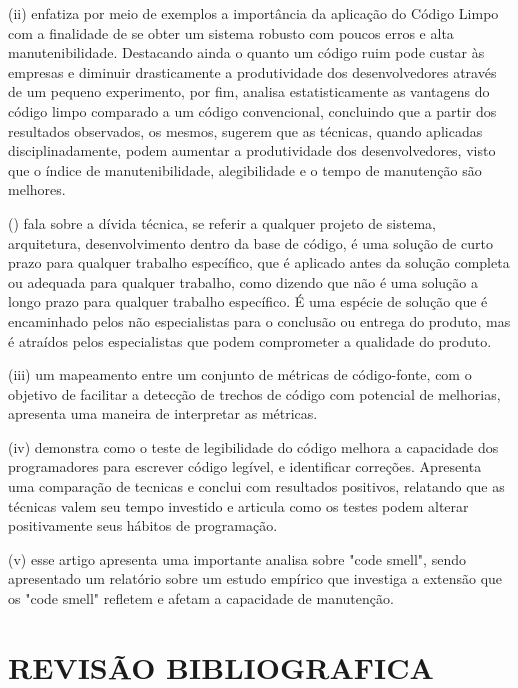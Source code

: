 \documentclass[12pt]{article}
\begin{document}
 (ii) \cite{TR_CLEAN_CODE_IMPORTANCIA} enfatiza por meio de exemplos a importância da aplicação do
Código Limpo com a finalidade de se obter um sistema robusto com poucos erros e alta manutenibilidade. Destacando ainda o quanto um código ruim pode custar às empresas e diminuir drasticamente a produtividade dos desenvolvedores através de um pequeno experimento, por fim, analisa estatisticamente as vantagens do código limpo comparado a um código convencional, concluindo que a partir dos resultados observados, os mesmos, sugerem que as técnicas, quando aplicadas disciplinadamente, podem aumentar a produtividade dos desenvolvedores, visto que o índice de manutenibilidade, alegibilidade e o tempo de manutenção são melhores.
 
 () \cite{TR_QC_TECHNICAL_DEBT} fala sobre a dívida técnica, se referir a qualquer projeto de sistema, arquitetura, desenvolvimento dentro da base de código, é uma solução de curto prazo para qualquer trabalho específico, que é aplicado antes da solução completa ou adequada para
qualquer trabalho, como dizendo que não é uma solução a longo prazo para qualquer trabalho específico. É uma espécie de solução que é encaminhado pelos não especialistas para o conclusão ou entrega do produto, mas é atraídos pelos especialistas que podem comprometer a qualidade do produto.

 (iii) \cite{TR_CLEAN_CODE_METRICA} um mapeamento entre um conjunto de métricas de código-fonte, com o objetivo de facilitar a detecção de trechos de código com potencial de melhorias, apresenta uma maneira de interpretar as métricas.

 (iv) \cite{CODE_READABILITY_TESTING_STUDY} demonstra
como o teste de legibilidade do código melhora a capacidade dos programadores
para escrever código legível, e identificar correções. Apresenta uma comparação de tecnicas e conclui com resultados positivos, relatando que as técnicas valem seu tempo investido e articula como os testes podem alterar positivamente seus hábitos de programação.
 
 (v) \cite{CODE_SMELLS_REFLECT_IMPORTANT_MAINTAINABILITY_ASPECTS} esse artigo apresenta uma importante analisa sobre "code smell", sendo apresentado um relatório sobre um estudo empírico que investiga a extensão que os "code smell" refletem e afetam a capacidade de manutenção.

\part{REVISÃO BIBLIOGRAFICA} \label{sec:revisaobibliografica}
\end{document}
